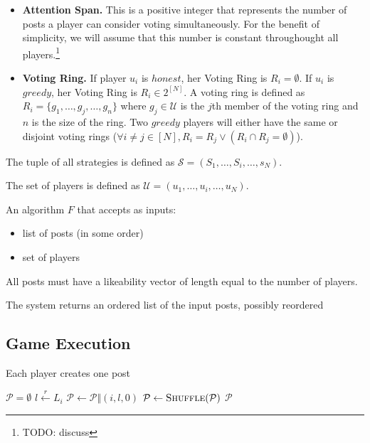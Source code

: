 \begin{definition}[Player]
\begin{itemize}
\begin{itemize}
          \item \textbf{Attention Span.} This is a positive integer that
          represents the number of posts a player can consider voting
          simultaneously. For the benefit of simplicity, we will assume that this
          number is constant throughought all players.\footnote{TODO: discuss}

          \item \textbf{Voting Ring.}  If player $u_i$ is $honest$, her Voting
          Ring is $R_i = \emptyset$. If $u_i$ is $greedy$, her Voting Ring is $R_i
          \in 2^{\left[N\right]}$. A voting ring is defined as $R_i = \lbrace
          g_1, \dots, g_j, \dots, g_n \rbrace$ where $g_j \in \mathcal{U}$ is the
          $j$th member of the voting ring and $n$ is the size of the ring. Two
          $greedy$ players will either have the same or disjoint voting rings
          ($\forall i \neq j \in \left[N\right], R_i = R_j \vee \left(R_i \cap
          R_j = \emptyset\right)$).
        \end{itemize}
        The tuple of all strategies is defined as $\mathcal{S} = (S_1, \dots,
        S_i, \dots, s_N)$.
      \end{itemize}
      The set of players is defined as $\mathcal{U} = \left(u_1, \dots, u_i,
      \dots, u_N\right)$.
    \end{definition}

    \begin{definition}
      An algorithm $F$ that accepts as inputs:
      \begin{itemize}
        \item list of posts (in some order)
        \item set of players
      \end{itemize}
      All posts must have a likeability vector of length equal to the number of
      players.

      The system returns an ordered list of the input posts, possibly reordered
    \end{definition}

  \subsection{Game Execution}
    \begin{algorithm}
      \caption{Each player creates one post}
      \label{alg:postGen}
      \begin{algorithmic}[1]
        \State $\mathcal{P} = \emptyset$ 
           \State $l \xleftarrow{r} L_i$
           \State $\mathcal{P} \leftarrow \mathcal{P} \Vert \left(i, l, 0\right)$
        \EndFor
        \State $\mathcal{P} \leftarrow \textsc{Shuffle}(\mathcal{P})$
        \State \Return $\mathcal{P}$
      \EndFunction
      \end{algorithmic}
    \end{algorithm}

